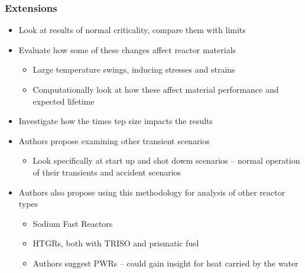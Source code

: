 \begin{frame}
  \frametitle{Extensions}
  \begin{itemize}
  \item Look at results of normal criticality, compare them with limits

  \item Evaluate how some of these changes affect reactor materials
    \begin{itemize}
      \item Large temperature swings, inducing stresses and strains
      \item Computationally look at how these affect material performance and expected lifetime
    \end{itemize}
  \item Investigate how the times tep size impacts the results
  \item Authors propose examining other transient scenarios
    \begin{itemize}
      \item Look specifically at start up and shot dowm scenarios -- normal operation of their transients and accident scenarios
  
    \end{itemize}
    \item Authors also propose using this methodology for analysis of other reactor types
    \begin{itemize}
      \item Sodium Fast Reactors
      \item HTGRs, both with TRISO and prismatic fuel
      \item Authors suggest PWRs -- could gain insight for heat carried by the water
    \end{itemize}

\end{itemize}  
\end{frame}

